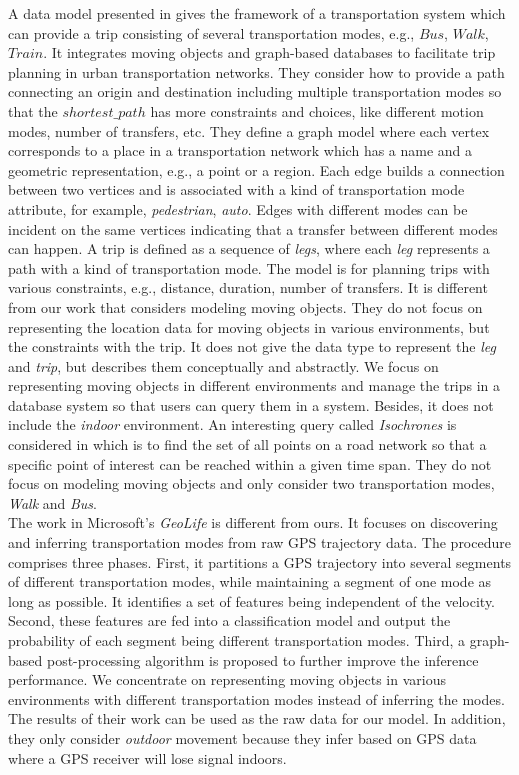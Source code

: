 A data model presented in \cite{BSWC09} gives the framework of a transportation
system which can provide a trip consisting of several transportation modes,
e.g., $Bus$, $Walk$, $Train$. It integrates moving objects and graph-based databases to
facilitate trip planning in urban transportation networks. They consider how to provide 
a path connecting an origin and destination including multiple transportation modes so that 
the $shortest\_path$ has more constraints and choices, like different motion modes, number of 
transfers, etc. They define a graph model where each vertex
corresponds to a place in a transportation network which has a name and a geometric  
representation, e.g., a point or a region. Each edge builds a connection between two vertices
and is associated with a kind of transportation mode attribute, for example, 
\textit{pedestrian}, \textit{auto}. Edges with different modes can be incident on the same 
vertices indicating that a transfer between different modes can happen. A trip is defined as a 
sequence of \textit{legs}, where each \textit{leg} represents a path with a kind of transportation mode. The model is for planning trips with various constraints, e.g., distance, duration, number
of transfers. It is different from our work that considers modeling moving objects. 
They do not focus on representing the location data for moving objects in various  
environments, but the constraints with the trip. It does not give the data type to represent 
the \textit{leg} and \textit{trip}, but describes them conceptually and abstractly. We focus on representing moving objects in different environments and manage the trips in a database system so that users can query them in a system. Besides, it does not include the \textit{indoor} environment. An interesting query 
called \textit{Isochrones} is considered in \cite{BGLPPT2008} which is to find the set of
all points on a road network so that a specific point of interest can be 
reached within a given time span. They do not focus on modeling moving objects and only consider 
two transportation modes, \textit{Walk} and \textit{Bus}. \\

The work in Microsoft's \textit{GeoLife} \cite{ZLWX08,ZCXM09} is different from ours. It focuses on 
discovering and inferring transportation modes from raw GPS trajectory data. The procedure 
comprises three phases. First, it partitions
a GPS trajectory into several segments of different transportation modes, while maintaining a 
segment of one mode as long as possible. It identifies a set of features being independent of the velocity. Second, these features are fed into a 
classification model and output the probability of each segment being different 
transportation modes. Third, a graph-based post-processing algorithm is proposed to further
improve the inference performance. We concentrate on representing moving objects
in various environments with different transportation modes instead of inferring the modes. The results of their work can be used as the raw data for our model. In addition, they only consider \textit{outdoor} movement because they infer based on GPS data where a GPS receiver will lose signal indoors. \\
		


